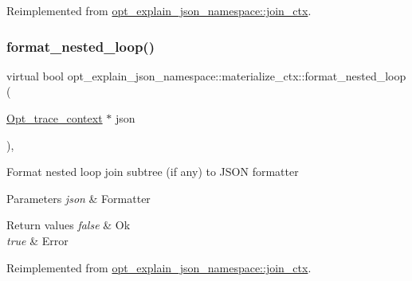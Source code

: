 Reimplemented from \mbox{\hyperlink{classopt__explain__json__namespace_1_1join__ctx_aa37b36787c204c852a8d7578459cfbc0}{opt\+\_\+explain\+\_\+json\+\_\+namespace\+::join\+\_\+ctx}}.

\mbox{\label{classopt__explain__json__namespace_1_1materialize__ctx_a39fa8eaa0f3b84b0f18d4d0fac41a50c}} 
\subsubsection{\texorpdfstring{format\+\_\+nested\+\_\+loop()}{format\_nested\_loop()}}
{\footnotesize\ttfamily virtual bool opt\+\_\+explain\+\_\+json\+\_\+namespace\+::materialize\+\_\+ctx\+::format\+\_\+nested\+\_\+loop (\begin{DoxyParamCaption}\item[{\mbox{\hyperlink{classOpt__trace__context}{Opt\+\_\+trace\+\_\+context}} $\ast$}]{json }\end{DoxyParamCaption})\hspace{0.3cm}{\ttfamily [inline]}, {\ttfamily [virtual]}}

Format nested loop join subtree (if any) to J\+S\+ON formatter


\begin{DoxyParams}{Parameters}
{\em json} & Formatter\\
\hline
\end{DoxyParams}

\begin{DoxyRetVals}{Return values}
{\em false} & Ok \\
\hline
{\em true} & Error \\
\hline
\end{DoxyRetVals}


Reimplemented from \mbox{\hyperlink{classopt__explain__json__namespace_1_1join__ctx_a83f0f4dde495c7ca7063692cbfbefbdf}{opt\+\_\+explain\+\_\+json\+\_\+namespace\+::join\+\_\+ctx}}.

\mbox{\label{classopt__explain__json__namespace_1_1materialize__ctx_ae1e9e31aa9072cf01733c417a1821773}} 
